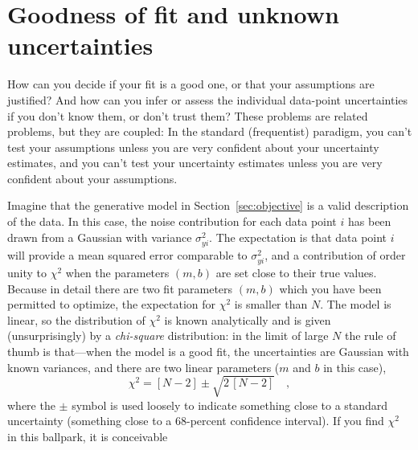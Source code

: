 \documentclass[12pt,twoside]{article}
\newcommand{\sectionname}{Section}
\newcounter{problem}
\begin{document}
\section{Goodness of fit and unknown uncertainties}\label{sec:goodness}

How can you decide if your fit is a good one, or that your assumptions
are justified?  And how can you infer or assess the individual
data-point uncertainties if you don't know them, or don't trust them?
These problems are related problems, but they are coupled: In the
standard (frequentist) paradigm, you can't test your assumptions
unless you are very confident about your uncertainty estimates, and
you can't test your uncertainty estimates unless you are very
confident about your assumptions.

Imagine that the generative model in \sectionname~\ref{sec:objective}
is a valid description of the data.  In this case, the noise
contribution for each data point $i$ has been drawn from a Gaussian
with variance $\sigma_{yi}^2$.  The expectation is that data point $i$
will provide a mean squared error comparable to $\sigma_{yi}^2$, and a
contribution of order unity to $\chi^2$ when the parameters $(m,b)$
are set close to their true values.  Because in detail there are two
fit parameters $(m,b)$ which you have been permitted to optimize, the
expectation for $\chi^2$ is smaller than $N$. The model is linear, so
the distribution of $\chi^2$ is known analytically and is given
(unsurprisingly) by a \emph{chi-square} distribution: in the limit of
large $N$ the rule of thumb is that---when the model is a good fit,
the uncertainties are Gaussian with known variances, and there are two
linear parameters ($m$ and $b$ in this case),
\begin{equation}
\chi^2 = [N-2] \pm \sqrt{2\,[N-2]} \quad ,
\end{equation}
where the $\pm$ symbol is used loosely to indicate something close to
a standard uncertainty (something close to a 68-percent confidence
interval).  If you find $\chi^2$ in this ballpark, it is conceivable
\end{document}
